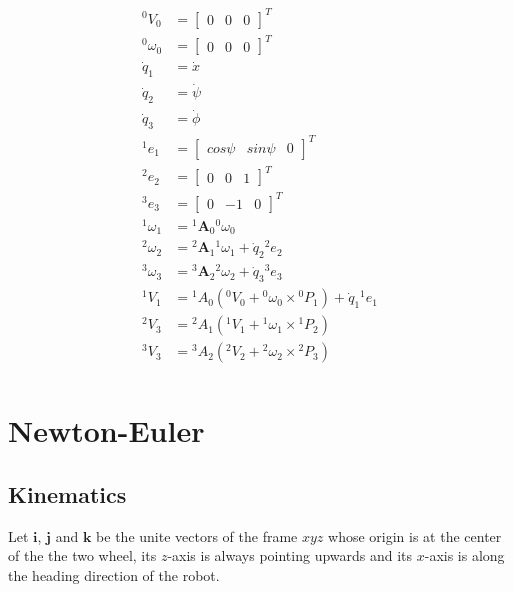 \documentclass[a4paper,10pt]{article}
\begin{document}
\begin{align}
 {}^0V_0 &= \left[\begin{matrix} 0 & 0 & 0 \end{matrix}\right]^T \\
 {}^0\omega_0 &= \left[\begin{matrix} 0 & 0 & 0 \end{matrix}\right]^T \\
 \dot{q}_1 &= \dot{x} \\
 \dot{q}_2 &= \dot{\psi} \\
 \dot{q}_3 &= \dot{\phi} \\
 {}^1e_1 &= \left[\begin{matrix} cos\psi & sin\psi & 0 \end{matrix}\right]^T \\
 {}^2e_2 &= \left[\begin{matrix} 0 & 0 & 1 \end{matrix}\right]^T \\
 {}^3e_3 &= \left[\begin{matrix} 0 & -1 & 0 \end{matrix}\right]^T \\
 {}^1\omega_1 &= {}^1\mathbf{A}_0 {}^0\omega_0 \\
 {}^2\omega_2 &= {}^2\mathbf{A}_1 {}^1\omega_1 + \dot{q}_2 {}^2e_2 \\
 {}^3\omega_3 &= {}^3\mathbf{A}_2 {}^2\omega_2 + \dot{q}_3 {}^3e_3 \\
 {}^1V_1 &= {}^1A_0({}^0V_0 + {}^0\omega_0 \times {}^0P_1) + \dot{q}_1 {}^1e_1 \\
 {}^2V_3 &= {}^2A_1({}^1V_1 + {}^1\omega_1 \times {}^1P_2) \\
 {}^3V_3 &= {}^3A_2({}^2V_2 + {}^2\omega_2 \times {}^2P_3) \\
\end{align}

\section{Newton-Euler}
\subsection{Kinematics}
Let $\mathbf{i}$, $\mathbf{j}$ and $\mathbf{k}$ be the unite vectors of the frame $xyz$ whose origin is at the center
of the the two wheel, its $z$-axis is always pointing upwards and its $x$-axis is along the heading direction of the
robot.
\end{document}
